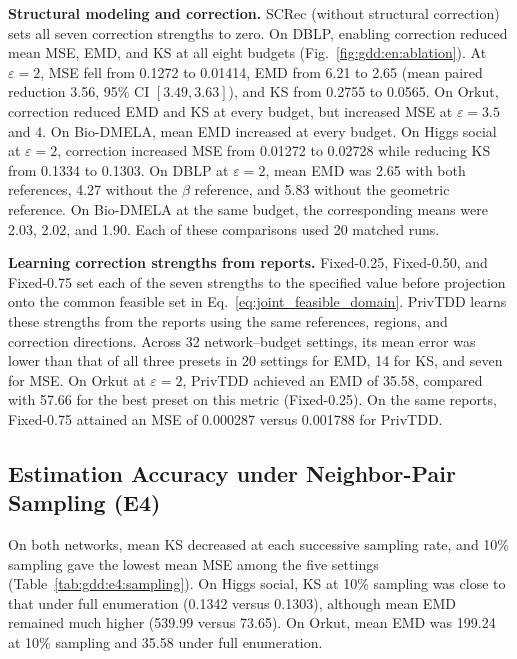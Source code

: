 \noindent\textbf{Structural modeling and correction.}
SCRec (without structural correction) sets all seven correction strengths to zero.
On DBLP, enabling correction reduced mean MSE, EMD, and KS at all eight budgets (Fig.~\ref{fig:gdd:en:ablation}).
At $\varepsilon=2$, MSE fell from 0.1272 to 0.01414, EMD from 6.21 to 2.65 (mean paired reduction 3.56, 95\% CI $[3.49,3.63]$), and KS from 0.2755 to 0.0565.
On Orkut, correction reduced EMD and KS at every budget, but increased MSE at $\varepsilon=3.5$ and $4$.
On Bio-DMELA, mean EMD increased at every budget. On Higgs social at $\varepsilon=2$, correction increased MSE from 0.01272 to 0.02728 while reducing KS from 0.1334 to 0.1303.
On DBLP at $\varepsilon=2$, mean EMD was 2.65 with both references, 4.27 without the $\beta$ reference, and 5.83 without the geometric reference. On Bio-DMELA at the same budget, the corresponding means were 2.03, 2.02, and 1.90. Each of these comparisons used 20 matched runs.
 
\noindent\textbf{Learning correction strengths from reports.}
Fixed-0.25, Fixed-0.50, and Fixed-0.75 set each of the seven strengths to the specified value before projection onto the common feasible set in Eq.~\eqref{eq:joint_feasible_domain}.
PrivTDD learns these strengths from the reports using the same references, regions, and correction directions.
Across 32 network--budget settings, its mean error was lower than that of all three presets in 20 settings for EMD, 14 for KS, and seven for MSE.
On Orkut at $\varepsilon=2$, PrivTDD achieved an EMD of 35.58, compared with 57.66 for the best preset on this metric (Fixed-0.25).
On the same reports, Fixed-0.75 attained an MSE of 0.000287 versus 0.001788 for PrivTDD.



\subsection{Estimation Accuracy under Neighbor-Pair Sampling (E4)}\label{sec:gdd:en:cost}


On both networks, mean KS decreased at each successive sampling rate, and 10\% sampling gave the lowest mean MSE among the five settings (Table~\ref{tab:gdd:e4:sampling}).
On Higgs social, KS at 10\% sampling was close to that under full enumeration (0.1342 versus 0.1303), although mean EMD remained much higher (539.99 versus 73.65).
On Orkut, mean EMD was 199.24 at 10\% sampling and 35.58 under full enumeration.

